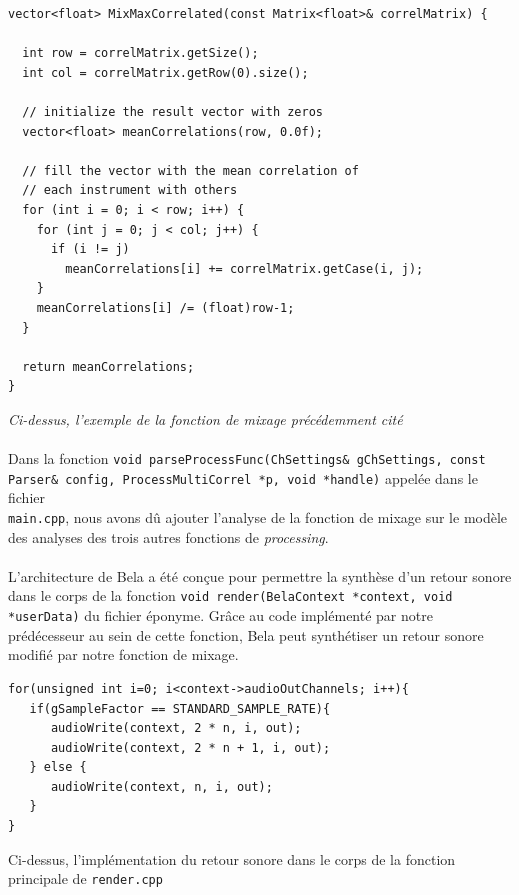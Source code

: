 \begin{lstlisting}
vector<float> MixMaxCorrelated(const Matrix<float>& correlMatrix) {

  int row = correlMatrix.getSize();
  int col = correlMatrix.getRow(0).size();

  // initialize the result vector with zeros
  vector<float> meanCorrelations(row, 0.0f);

  // fill the vector with the mean correlation of
  // each instrument with others
  for (int i = 0; i < row; i++) {
    for (int j = 0; j < col; j++) {
      if (i != j)
        meanCorrelations[i] += correlMatrix.getCase(i, j);
    }
    meanCorrelations[i] /= (float)row-1;
  }

  return meanCorrelations;
}
\end{lstlisting}

\begin{center}
 \textit{Ci-dessus, l'exemple de la fonction de mixage précédemment cité}
\end{center}

\paragraph{}
Dans la fonction
\verb!void parseProcessFunc(ChSettings& gChSettings, const!
\\ \verb!Parser& config, ProcessMultiCorrel *p, void *handle)!
appelée dans le fichier \\ \verb!main.cpp!, nous avons dû ajouter
l'analyse de la fonction de mixage sur le modèle des analyses des
trois autres fonctions de \textit{processing}.

\paragraph{}
L'architecture de Bela a été conçue pour permettre la synthèse d'un
retour sonore dans le corps de la fonction
\verb!void render(BelaContext *context, void *userData)! du fichier
éponyme. Grâce au code implémenté par notre prédécesseur au sein de
cette fonction, Bela peut synthétiser un retour sonore modifié par
notre fonction de mixage.

\begin{lstlisting}
for(unsigned int i=0; i<context->audioOutChannels; i++){
   if(gSampleFactor == STANDARD_SAMPLE_RATE){
      audioWrite(context, 2 * n, i, out);
      audioWrite(context, 2 * n + 1, i, out);
   } else {
      audioWrite(context, n, i, out);
   }
}
\end{lstlisting} \begin{center} Ci-dessus, l'implémentation du retour sonore
dans le corps de la fonction principale de \verb!render.cpp! \end{center}

